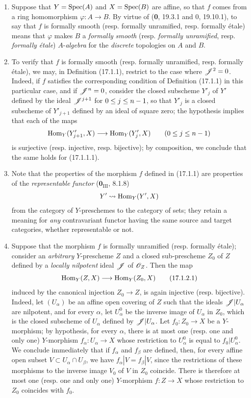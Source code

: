 \begin{remarks}[17.1.2]
\label{IV.17.1.2}
\begin{enumerate}
  \item[(i)] Suppose that $Y=\operatorname{Spec}(A)$ and $X=\operatorname{Spec}(B)$ are affine, so that $f$ comes from a ring homomorphism $\varphi:A\to B$. By virtue of (\textbf{0}, 19.3.1 and 0, 19.10.1), to say that $f$ is formally smooth (resp. formally unramified, resp. formally étale) means that $\varphi$ makes $B$ a \emph{formally smooth} (resp. \emph{formally unramified}, resp. \emph{formally étale}) $A$-\emph{algebra} for the \emph{discrete} topologies on $A$ and $B$.
  \item[(ii)] To verify that $f$ is formally smooth (resp. formally unramified, resp. formally étale), we may, in Definition (17.1.1), restrict to the case where $\mathscr{J}^2=0$. Indeed, if $f$ satisfies the corresponding condition of Definition (17.1.1) in this particular case, and if $\mathscr{J}^n=0$, consider the closed subscheme $Y'_j$ of $Y'$ defined by the ideal $\mathscr{J}^{j+1}$ for $0\leq j\leq n- 1$, so that $Y'_j$ is a closed subscheme of $Y'_{j+1}$ defined by an ideal of square zero; the hypothesis implies that each of the maps
  \[
    \operatorname{Hom}_Y(Y'_{j+1},X)\longrightarrow\operatorname{Hom}_Y(Y'_j,X)\qquad(0\leq j\leq n- 1)
  \]
  is surjective (resp. injective, resp. bijective); by composition, we conclude that the same holds for (17.1.1.1).
  \item[(iii)] Note that the properties of the morphism $f$ defined in (17.1.1) are properties of the \emph{representable functor} ($\mathbf{0}_{\mathrm{III}}$, 8.1.8)
  \[
    Y'\leadsto\operatorname{Hom}_Y(Y',X)
  \]
  from the category of $Y$-preschemes to the category of sets; they retain a meaning for \emph{any} contravariant functor having the same source and target categories, whether representable or not.
  \item[(iv)] Suppose that the morphism $f$ is formally unramified (resp. formally étale); consider an \emph{arbitrary} $Y$-prescheme $Z$ and a closed sub-prescheme $Z_0$ of $Z$ defined by a \emph{locally nilpotent} ideal $\mathscr{J}$ of $\mathscr{O}_Z$. Then the map
  \[
  \label{IV.17.1.2.1}
    \operatorname{Hom}_Y(Z,X)\longrightarrow\operatorname{Hom}_Y(Z_0,X)
    \tag{17.1.2.1}
  \]
  induced by the canonical injection $Z_0\to Z$, is again injective (resp. bijective). Indeed, let $(U_\alpha)$ be an affine open covering of $Z$ such that the ideals $\mathscr{J}|U_\alpha$ are nilpotent, and for every $\alpha$, let $U^0_\alpha$ be the inverse image of $U_\alpha$ in $Z_0$, which is the closed subscheme of $U_\alpha$ defined by $\mathscr{J}|U_\alpha$. Let $f_0:Z_0\to X$ be a $Y$-morphism; by hypothesis, for every $\alpha$, there is at most one (resp. one and only one) $Y$-morphism $f_\alpha:U_\alpha\to X$ whose restriction to $U^0_\alpha$ is equal to $f_0|U^0_\alpha$. We conclude immediately that if $f_\alpha$ and $f_\beta$ are defined, then, for every affine open subset $V\subset U_\alpha\cap U_\beta$, we have $f_\alpha|V=f_\beta|V$, since the restrictions of these morphisms to the inverse image $V_0$ of $V$ in $Z_0$ coincide. There is therefore at most one (resp. one and only one) $Y$-morphism $f:Z\to X$ whose restriction to $Z_0$ coincides with $f_0$.

\end{enumerate}
\end{remarks}
